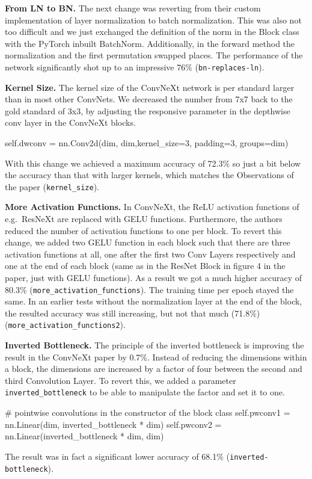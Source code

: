 \documentclass{article}
\begin{document}
\textbf{From LN to BN.} %
The next change was reverting from their custom implementation of layer normalization to batch normalization.
This was also not too difficult and we just exchanged the definition of the norm in the Block class with the PyTorch inbuilt BatchNorm.
Additionally, in the forward method the normalization and the first permutation swapped places.
The performance of the network significantly shot up to an impressive 76\% (\texttt{bn-replaces-ln}).

\textbf{Kernel Size.} %
The kernel size of the ConvNeXt network is per standard larger than in most other ConvNets.
We decreased the number from 7x7 back to the gold standard of 3x3, by adjusting the responsive parameter in the depthwise conv layer in the ConvNeXt blocks.
\begin{python}
self.dwconv = nn.Conv2d(dim, dim,kernel_size=3, padding=3, groups=dim)
\end{python}
With this change we achieved a maximum accuracy of 72.3\% so just a bit below the accuracy than that with larger kernels, which matches the Observations of the paper (\texttt{kernel\_size}).

\textbf{More Activation Functions.} %
In ConvNeXt, the ReLU activation functions of e.g.\ ResNeXt are replaced with GELU functions.
Furthermore, the authors reduced the number of activation functions to one per block.
To revert this change, we added two GELU function in each block such that there are three activation functions at all, one after the first two Conv Layers respectively and one at the end of each block (same as in the ResNet Block in figure 4 in the paper, just with GELU functions).
As a result we got a much higher accuracy of 80.3\% (\texttt{more\_activation\_functions}).
The training time per epoch stayed the same.
In an earlier tests without the normalization layer at the end of the block, the resulted accuracy was still increasing, but not that much (71.8\%) (\texttt{more\_activation\_functions2}).

\textbf{Inverted Bottleneck.} %
The principle of the inverted bottleneck is improving the result in the ConvNeXt paper by 0.7\%.
Instead of reducing the dimensions within a block, the dimensions are increased by a factor of four between the second and third Convolution Layer.
To revert this, we added a parameter \texttt{inverted\_bottleneck}
to be able to manipulate the factor and set it to one.
\begin{python}
# pointwise convolutions in the constructor of the block class
self.pwconv1 = nn.Linear(dim, inverted_bottleneck * dim)
self.pwconv2 = nn.Linear(inverted_bottleneck * dim, dim)
\end{python}
The result was in fact a significant lower accuracy of 68.1\% (\texttt{inverted-bottleneck}).
\end{document}
